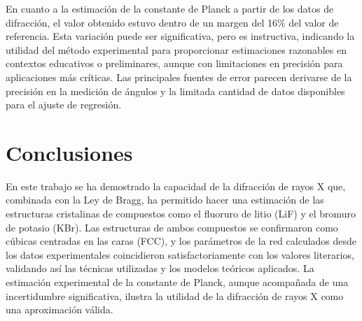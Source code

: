 \vspace{\baselineskip}

En cuanto a la estimación de la constante de Planck a partir de los datos de difracción, el valor obtenido estuvo dentro de un margen del 16\% del valor de referencia. Esta variación puede ser significativa, pero es instructiva, indicando la utilidad del método experimental para proporcionar estimaciones razonables en contextos educativos o preliminares, aunque con limitaciones en precisión para aplicaciones más críticas. Las principales fuentes de error parecen derivarse de la precisión en la medición de ángulos y la limitada cantidad de datos disponibles para el ajuste de regresión.



\section{Conclusiones}


En este trabajo  se ha demostrado la capacidad de la difracción de rayos X que, combinada con la Ley de Bragg, ha permitido hacer una estimación de las estructuras cristalinas de compuestos como el fluoruro de litio (LiF) y el bromuro de potasio (KBr). Las estructuras de ambos compuestos se confirmaron como cúbicas centradas en las caras (FCC), y los parámetros de la red calculados desde los datos experimentales coincidieron satisfactoriamente con los valores literarios, validando así las técnicas utilizadas y los modelos teóricos aplicados. La estimación experimental de la constante de Planck, aunque acompañada de una incertidumbre significativa, ilustra la utilidad de la difracción de rayos X como una aproximación válida.


